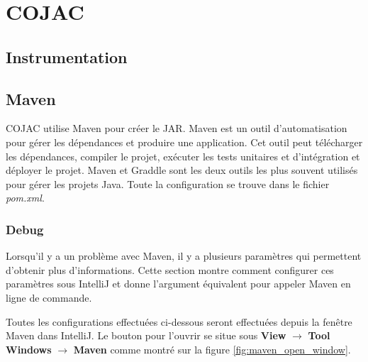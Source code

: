 
\chapter{COJAC}

\section{Instrumentation}

\section{Maven}

COJAC utilise Maven \cite{maven} pour créer le JAR. Maven \cite{maven} est un outil d'automatisation pour gérer les dépendances et produire une application. Cet outil peut télécharger les dépendances, compiler le projet, exécuter les tests unitaires et d'intégration et déployer le projet. Maven et Graddle sont les deux outils les plus souvent utilisés pour gérer les projets Java. Toute la configuration se trouve dans le fichier \textit{pom.xml}.

\subsection{Debug}

Lorsqu'il y a un problème avec Maven, il y a plusieurs paramètres qui permettent d'obtenir plus d'informations. Cette section montre comment configurer ces paramètres sous IntelliJ et donne l'argument équivalent pour appeler Maven en ligne de commande.

\subtitle{Ouvrir la fenêtre Maven}

Toutes les configurations effectuées ci-dessous seront effectuées depuis la fenêtre Maven dans IntelliJ. Le bouton pour l'ouvrir se situe sous \textbf{View} $\rightarrow$ \textbf{Tool Windows} $\rightarrow$ \textbf{Maven} comme montré sur la figure \ref{fig:maven_open_window}.

\begin{minipage}{\linewidth}%
\label{fig:maven_open_window}
\end{minipage}

\subtitle{Fenêtre Maven}

